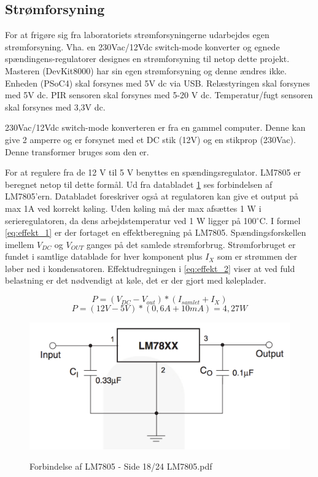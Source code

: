 \subsection{Strømforsyning}

For at frigøre sig fra laboratoriets strømforsyningerne udarbejdes egen strømforsyning. Vha. en 230Vac/12Vdc switch-mode konverter og egnede spændingens-regulatorer designes en strømforsyning til netop dette projekt. Masteren (DevKit8000) har sin egen strømforsyning og denne ændres ikke. Enheden (PSoC4) skal forsynes med 5V dc via USB. Relæstyringen skal forsynes med 5V dc. PIR sensoren skal forsynes med 5-20 V dc. Temperatur/fugt sensoren skal forsynes med 3,3V dc. 

230Vac/12Vdc switch-mode konverteren er fra en gammel computer. Denne kan give 2 amperre og er forsynet med et DC stik (12V) og en stikprop (230Vac). Denne transformer bruges som den er. 

For at regulere fra de 12 V til 5 V benyttes en spændingsregulator. LM7805 er beregnet netop til dette formål. Ud fra databladet \ref{lab:LM7805} ses forbindelsen af LM7805'ern. Databladet foreskriver også at regulatoren kan give et output på max 1A ved korrekt køling.  
\newline
Uden køling må der max afsættes 1 W i serieregulatoren, da dens arbejdstemperatur ved 1 W ligger på 100$^{\circ}$C.  I formel \ref{eq:effekt_1} er der fortaget en effektberegning på LM7805. Spændingsforskellen imellem $V_{DC}$ og $V_{OUT}$ ganges på det samlede strømforbrug. Strømforbruget er fundet i samtlige datablade for hver komponent plus $I_X$ som er strømmen der løber ned i kondensatoren. Effektudregningen i \ref{eq:effekt_2} viser at ved fuld belastning er det nødvendigt at køle, det er der gjort med køleplader. 

\begin{equation} 
P = (V_{DC}-V_{out})*(I_{samlet}+I_X) 
\label{eq:effekt_1}
\end{equation}
\begin{equation} 
P = (12V - 5V)*(0,6 A +10 mA)= 4,27 W 
\label{eq:effekt_2}
\end{equation}

\begin{figure}[H] \centering
{\includegraphics[width=\textwidth]{filer/design/Billeder/LM7805_DATASHEET}}
\caption{Forbindelse af LM7805 - Side 18/24 LM7805.pdf}
\label{lab:LM7805}
\raggedright
\end{figure}

